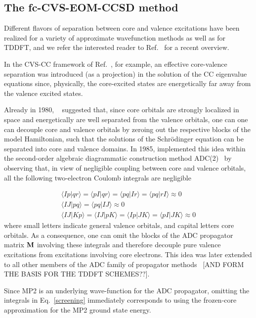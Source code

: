 \documentclass[journal=jctcce,manuscript=article]{achemso}
\begin{document}
\subsection{The fc-CVS-EOM-CCSD method}
{\color{red}Different flavors of separation between core and valence excitations have been realized for a variety of approximate wavefunction methods as well as for TDDFT, and we refer the interested reader to Ref.~ 
for a recent overview. 

In the CVS-CC framework of Ref.~, for example, an effective core-valence separation was introduced (as a projection) in the solution of the CC eigenvalue equations since, physically, the core-excited states are energetically far away from the valence excited states.

Already in 1980, \citeauthor{Cederbaum1980}~\cite{Cederbaum1980} suggested that,
since core orbitals are strongly localized in space and energetically are well separated from the valence orbitals, one can 
one can decouple core and valence orbitals by zeroing out the respective blocks of the model Hamiltonian, such that the solutions of the Schr\"odinger equation can be separated into core and valence domains.
In 1985, \citeauthor{Barth1985}\cite{Barth1985}  
implemented this idea within the second-order 
algebraic diagrammatic construction method ADC(2)~\cite{Schirmer,Dreuw:ADCrev:2014}
by observing that, in view of negligible coupling between core and valence orbitals, all the following two-electron Coulomb integrals are negligible

\begin{align}
\label{screening}
\langle Ip|qr \rangle = \langle pI|qr \rangle = \langle pq|Ir \rangle =
\langle pq|rI \rangle \approx 0 \\\nonumber 
\langle IJ | pq \rangle = \langle pq |IJ \rangle \approx 0 \\\nonumber
\langle IJ | Kp \rangle = \langle IJ | pK \rangle = 
\langle Ip | JK \rangle = \langle pI | JK \rangle \approx 0
\end{align}
where small letters indicate general valence orbitals, and capital letters  core orbitals. As a consequence,
one can omit the blocks of the ADC propagator matrix ${\bf M}$ involving these integrals and therefore decouple pure valence excitations from excitations involving core electrons. 
This idea was later extended to all other members of the ADC family of propagator methods~\cite{Schirmer2000,Dreuw:ADCrev:2014,wenzel2014} [AND FORM THE BASIS FOR THE TDDFT SCHEMES??].
}
Since MP2 is an underlying wave-function for the ADC propagator\cite{Dreuw:ADCrev:2014}, omitting the integrals in Eq.~\eqref{screening} immediately corresponds to using the frozen-core approximation for the MP2 ground state energy.
\end{document}
